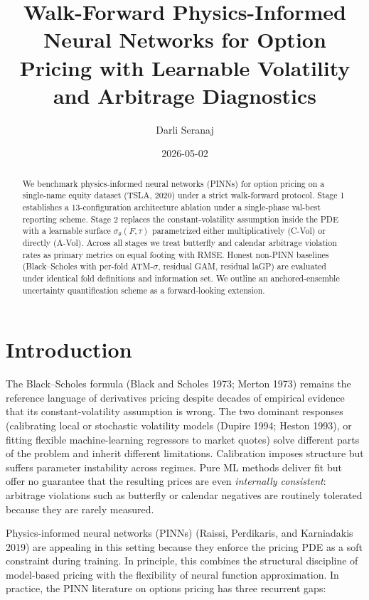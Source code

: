 \documentclass[
  11pt,
]{article}
\title{Walk-Forward Physics-Informed Neural Networks for Option Pricing
with Learnable Volatility and Arbitrage Diagnostics}
\author{Darli Seranaj}
\date{2026-05-02}
\begin{document}
\maketitle
\begin{abstract}
We benchmark physics-informed neural networks (PINNs) for option pricing
on a single-name equity dataset (TSLA, 2020) under a strict walk-forward
protocol. Stage 1 establishes a 13-configuration architecture ablation
under a single-phase val-best reporting scheme. Stage 2 replaces the
constant-volatility assumption inside the PDE with a learnable surface
\(\sigma_\theta(F,\tau)\) parametrized either multiplicatively (C-Vol)
or directly (A-Vol). Across all stages we treat butterfly and calendar
arbitrage violation rates as primary metrics on equal footing with RMSE.
Honest non-PINN baselines (Black--Scholes with per-fold ATM-\(\sigma\),
residual GAM, residual laGP) are evaluated under identical fold
definitions and information set. We outline an anchored-ensemble
uncertainty quantification scheme as a forward-looking extension.
\end{abstract}


\pagebreak

\section{Introduction}\label{introduction}

The Black--Scholes formula (Black and Scholes 1973; Merton 1973) remains
the reference language of derivatives pricing despite decades of
empirical evidence that its constant-volatility assumption is wrong. The
two dominant responses (calibrating local or stochastic volatility
models (Dupire 1994; Heston 1993), or fitting flexible machine-learning
regressors to market quotes) solve different parts of the problem and
inherit different limitations. Calibration imposes structure but suffers
parameter instability across regimes. Pure ML methods deliver fit but
offer no guarantee that the resulting prices are even \emph{internally
consistent}: arbitrage violations such as butterfly or calendar
negatives are routinely tolerated because they are rarely measured.

Physics-informed neural networks (PINNs) (Raissi, Perdikaris, and
Karniadakis 2019) are appealing in this setting because they enforce the
pricing PDE as a soft constraint during training. In principle, this
combines the structural discipline of model-based pricing with the
flexibility of neural function approximation. In practice, the PINN
literature on options pricing has three recurrent gaps:
\end{document}
